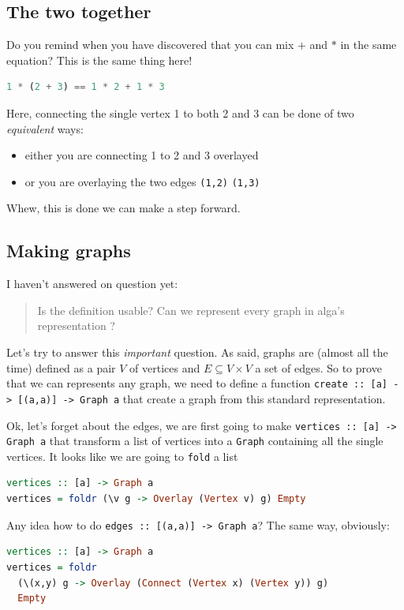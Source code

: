 \documentclass[10pt,a4paper]{article}
\begin{document}
\subsection{The two together}
Do you remind when you have discovered that you can mix $+$ and $*$ in the same equation? This is the same thing here!
\begin{lstlisting}[language=Haskell, frame=single]
1 * (2 + 3) == 1 * 2 + 1 * 3
\end{lstlisting}
Here, connecting the single vertex 1 to both 2 and 3 can be done of two \emph{equivalent} ways: 
\begin{itemize}
	\item either you are connecting 1 to 2 and 3 overlayed
	\item or you are overlaying the two edges \verb|(1,2)| \verb|(1,3)|
\end{itemize}

Whew, this is done we can  make a step forward.

\subsection{Making graphs}
I haven't answered on question yet:
\begin{quote}
	Is the definition usable? Can we represent every graph in alga's representation ?
\end{quote}

Let's try to answer this \emph{important} question. As said, graphs are (almost all the time) defined as a pair $V$ of vertices and $E \subseteq V \times V$ a set of edges. So to prove that we can represents any graph, we need to define a function \verb|create :: [a] -> [(a,a)] -> Graph a| that create a graph from this standard representation.

Ok, let's forget about the edges, we are first going to make \verb|vertices :: [a] -> Graph a| that transform a list of vertices into a \verb|Graph| containing all the single vertices. It looks like we are going to \verb|fold| a list

\begin{lstlisting}[language=Haskell, frame=single]
vertices :: [a] -> Graph a
vertices = foldr (\v g -> Overlay (Vertex v) g) Empty
\end{lstlisting}

Any idea how to do \verb|edges :: [(a,a)] -> Graph a|? The same way, obviously:

\begin{lstlisting}[language=Haskell, frame=single]
vertices :: [a] -> Graph a
vertices = foldr 
  (\(x,y) g -> Overlay (Connect (Vertex x) (Vertex y)) g)
  Empty
\end{lstlisting}
\end{document}
